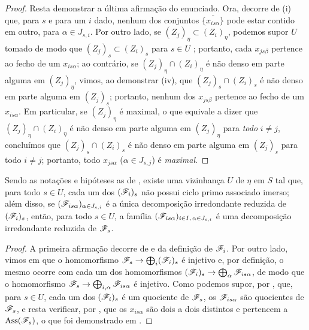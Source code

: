 \begin{proof}
Resta demonstrar a última afirmação do enunciado.
Ora, decorre de (i) que, para $s$ e para um $i$ dado, nenhum dos conjuntos $\overline{\{x_{is\alpha}\}}$ pode estar contido em outro, para $\alpha\in J_{s,i}$.
Por outro lado, se $(Z_j)_\eta\subset(Z_i)_\eta$, podemos supor $U$ tomado de modo que $(Z_j)_s\subset(Z_i)_s$ para $s\in U$ ; portanto, cada $x_{js\beta}$ pertence ao fecho de um $x_{is\alpha}$; ao contrário, se $(Z_j)_\eta\cap(Z_i)_\eta$ é não denso em parte alguma em $(Z_j)_\eta$, vimos, ao demonstrar (iv), que $(Z_j)_s\cap(Z_i)_s$ é não denso em parte alguma em $(Z_j)_s$; portanto, nenhum dos $x_{js\beta}$ pertence ao fecho de um $x_{is\alpha}$.
Em particular, se $(Z_j)_\eta$ é maximal, o que equivale a dizer que $(Z_j)_\eta\cap(Z_i)_\eta$ é não denso em parte alguma em $(Z_j)_\eta$ para \emph{todo} $i\neq j$, concluímos que $(Z_j)_s\cap(Z_i)_s$ é não denso em parte alguma em $(Z_j)_s$ para todo $i\neq j$; portanto, todo $x_{js\alpha}$ ($\alpha\in J_{s,j}$) é \emph{maximal}.
\end{proof}

\begin{corollary}[9.8.4]
\label{IV.9.8.4}
Sendo as notações e hipóteses as de \emph{}, existe uma vizinhança $U$ de $\eta$ em $S$ tal que, para todo $s\in U$, cada um dos $(\mathscr{F}_i)_s$ não possui ciclo primo associado imerso; além disso, se $(\mathscr{F}_{is\alpha})_{\alpha\in J_{s,i}}$ é a única decomposição irredondante reduzida de $(\mathscr{F}_i)_s$, então, para todo $s\in U$, a família $(\mathscr{F}_{is\alpha})_{i\in I,\,\alpha\in J_{s,i}}$ é uma decomposição irredondante reduzida de $\mathscr{F}_s$.
\end{corollary}

\begin{proof}
\label{IV.9.8.4-proof}
A primeira afirmação decorre de  e da definição de $\mathscr{F}_i$.
Por outro lado, vimos em  que o homomorfismo $\sh{F}_s\to\bigoplus_i(\sh{F}_i)_s$ é injetivo e, por definição, o mesmo ocorre com cada um dos homomorfismos $(\sh{F}_i)_s\to\bigoplus_\alpha\sh{F}_{is\alpha}$, de modo que o homomorfismo $\sh{F}_s\to\bigoplus_{i,\alpha}\sh{F}_{is\alpha}$ é injetivo.
Como podemos supor, por , que, para $s\in U$, cada um dos $(\mathscr{F}_i)_s$ é um quociente de $\mathscr{F}_s$, os $\mathscr{F}_{is\alpha}$ são quocientes de $\mathscr{F}_s$, e resta verificar, por , que os $x_{is\alpha}$ são dois a dois distintos e pertencem a $\operatorname{Ass}(\mathscr{F}_s)$, o que foi demonstrado em .
\end{proof}


